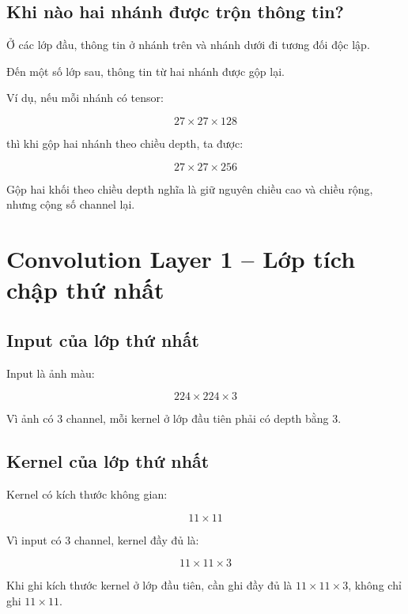 \subsection{Khi nào hai nhánh được trộn thông tin?}

Ở các lớp đầu, thông tin ở nhánh trên và nhánh dưới đi tương đối độc lập.

Đến một số lớp sau, thông tin từ hai nhánh được gộp lại.

Ví dụ, nếu mỗi nhánh có tensor:

\[
    27\times27\times128
\]

thì khi gộp hai nhánh theo chiều depth, ta được:

\[
    27\times27\times256
\]

\begin{ghinho}
Gộp hai khối theo chiều depth nghĩa là giữ nguyên chiều cao và chiều rộng, nhưng cộng số channel lại.
\end{ghinho}

\section{Convolution Layer 1 -- Lớp tích chập thứ nhất}

\subsection{Input của lớp thứ nhất}

Input là ảnh màu:

\[
    224\times224\times3
\]

Vì ảnh có 3 channel, mỗi kernel ở lớp đầu tiên phải có depth bằng 3.

\subsection{Kernel của lớp thứ nhất}

Kernel có kích thước không gian:

\[
    11\times11
\]

Vì input có 3 channel, kernel đầy đủ là:

\[
    11\times11\times3
\]

\begin{canhbao}
Khi ghi kích thước kernel ở lớp đầu tiên, cần ghi đầy đủ là $11\times11\times3$, không chỉ ghi $11\times11$.
\end{canhbao}


